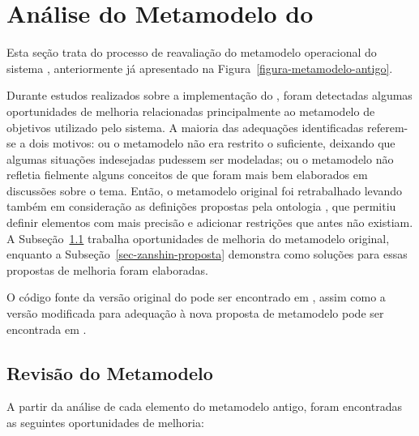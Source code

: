 
\chapter{Análise do Metamodelo do \zanshin}
\label{sec-zanshin}

Esta seção trata do processo de reavaliação do metamodelo operacional do sistema \zanshin, anteriormente já apresentado na Figura~\ref{figura-metamodelo-antigo}.

Durante estudos realizados sobre a implementação do \framework \zanshin, foram detectadas algumas oportunidades de melhoria relacionadas principalmente ao metamodelo de objetivos utilizado pelo sistema. A maioria das adequações identificadas referem-se a dois motivos: ou o metamodelo não era restrito o suficiente, deixando que algumas situações indesejadas pudessem ser modeladas; ou o metamodelo não refletia fielmente alguns conceitos de \gore que foram mais bem elaborados em discussões sobre o tema. Então, o metamodelo original foi retrabalhado levando também em consideração as definições propostas pela ontologia \goro, que permitiu definir elementos com mais precisão e adicionar restrições que antes não existiam. A Subseção~\ref{sec-zanshin-revisao} trabalha oportunidades de melhoria do metamodelo original, enquanto a Subseção~\ref{sec-zanshin-proposta} demonstra como soluções para essas propostas de melhoria foram elaboradas.

O código fonte da versão original do \zanshin pode ser encontrado em \codigoZanshin, assim como a versão modificada para adequação à nova proposta de metamodelo pode ser encontrada em \novocodigoZanshin.

\section{Revisão do Metamodelo}
\label{sec-zanshin-revisao}
A partir da análise de cada elemento do metamodelo antigo, foram encontradas as seguintes oportunidades de melhoria:

